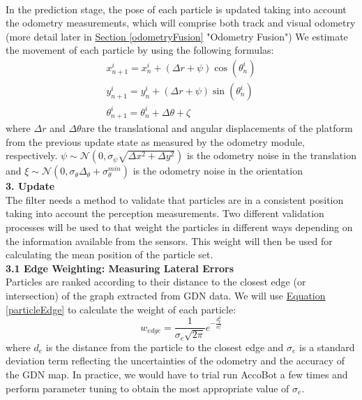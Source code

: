 \documentclass[11pt]{article}		%
\newcommand{\equationref}[1]{\hyperref[#1]{Equation \ref*{#1}}}     %
\newcommand{\sectref}[1]{\hyperref[#1]{Section \ref*{#1}}}     %
\begin{document}
	    \\In the prediction stage, the pose of each particle is updated taking into account the odometry measurements, which will comprise both track and visual odometry (more detail later in \sectref{odometryFusion} "Odometry Fusion") We estimate the movement of each particle by using the following formulas:
	    \begin{equation}
\begin{array}{l}
x_{n+1}^{i}=x_{n}^{i}+(\Delta r+\psi) \cos \left(\theta_{n}^{i}\right) \\
y_{n+1}^{i}=y_{n}^{i}+(\Delta r+\psi) \sin \left(\theta_{n}^{i}\right) \\
\theta_{n+1}^{i}=\theta_{n}^{i}+\Delta \theta+\zeta
\end{array}
\end{equation}
    where $\Delta r$ and $\Delta \theta$are the translational and angular displacements of the platform from the previous
    update state as measured by the odometry module, respectively. $\psi \sim \mathcal{N}\left(0, \sigma_{\psi} \sqrt{\Delta x^{2}+\Delta y^{2}}\right)$ is the odometry noise in the translation and $\xi \sim \mathcal{N}\left(0, \sigma_{\theta} \Delta_{\theta}+\sigma_{\theta}^{m i n}\right)$ is the odometry noise in the orientation
	\\\textbf{3. Update}
	\\The filter needs a method to validate that particles are in a consistent position taking into account the perception measurements. Two different validation processes will be used to that weight the particles in different ways depending on the information available from the sensors.
    This weight will then be used for calculating the mean position of the particle set.
    \\\textbf{3.1 Edge Weighting: Measuring Lateral Errors}
    \\Particles are ranked according to their distance to the closest edge (or intersection) of the graph extracted from GDN data. We will use \equationref{particleEdge} to calculate the weight of each particle:
    \begin{equation}
w_{e d g e}=\frac{1}{\sigma_{e} \sqrt{2 \pi}} e^{-\frac{d_{p}^{2}}{\sigma_{e}^{2}}} \label{particleEdge}
\end{equation}
    where $d_e$ is the distance from the particle to the closest edge and $\sigma_e$ is a standard deviation term reflecting the uncertainties of the odometry and the accuracy of the GDN map. In practice, we would have to trial run AccoBot a few times and perform parameter tuning to obtain the most appropriate value of $\sigma_e$.
    
\end{document}
